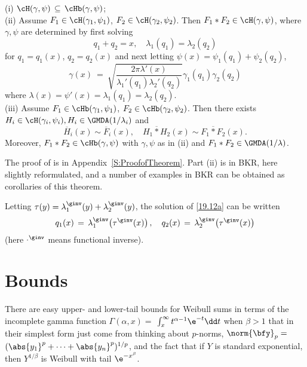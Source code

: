 \begin{theorem}\label{Th:19.12a}
{\rm (i)} $\cH(\gamma,\psi)\,\subseteq\,\cHb(\gamma,\psi)$;\\
 {\rm (ii)} Assume $F_1\in \cH(\gamma_1,\psi_1)$, $F_2\in \cH(\gamma_2,\psi_2)$. Then
 $F_1*F_2\in\cH(\gamma,\psi)$,
 where $\gamma,\psi$ are determined by first solving
 \begin{equation}\label{19.12a} q_1+q_2=x,\quad \lambda_1(q_1)=\lambda_2(q_2) \end{equation}
 for $q_1=q_1(x)$, $q_2=q_2(x)$ and next letting $\psi(x)=\psi_1(q_1)+\psi_2(q_2)$,
 \[\gamma(x)\ =\ \sqrt{ \frac{2\pi \lambda'(x)}{\lambda_1'(q_1) \lambda_2'(q_2)}}
\gamma_1(q_1)\gamma_2(q_2)
 \]
 where $\lambda(x)=\psi'(x)=\lambda_1(q_1)=\lambda_2(q_2)$.\\
  {\rm (iii)} Assume $F_1\in \cHb(\gamma_1,\psi_1)$, $F_2\in \cHb(\gamma_2,\psi_2)$. Then
	there exists $H_i \in  \cH(\gamma_i,\psi_i), H_i \in \GMDA(1/\lambda_i)$ and
	$$\overline H_i(x) \sim \overline F_i(x), \quad \overline{H_1*H_2}(x) \sim
	\overline{F_1*F_2}(x)  .$$
Moreover,   $F_1*F_2\in\cHb(\gamma,\psi)$ with $\gamma,\psi$ as in {\rm (ii)} and
$F_1*F_2\in \GMDA(1/\lambda)$.
\end{theorem}

The proof of  is in Appendix~\ref{S:ProofofTheorem}.
Part (ii) is in BKR, here slightly reformulated, and
a number of examples in BKR can be obtained as corollaries of this theorem.

\begin{remark}\label{Rem:19.12a}
Letting $\tau(y)=\lambda_1^{{\ginv}}(y)+\lambda_2^{{\ginv}}(y)$, the solution of \eqref{19.12a} can be written
\begin{equation}\label{19.12aa} q_1(x)\,=\,\lambda_1^{{\ginv}}\bigl(\tau^{{\ginv}}(x)\bigr) \,,\quad
q_2(x)\,=\,\lambda_2^{{\ginv}}\bigl(\tau^{{\ginv}}(x)\bigr)\end{equation}
(here $\cdot^{{\ginv}}$ means functional inverse).
\remQED\end{remark}

\section{Bounds}\label{S:Bounds}

There are easy upper- and lower-tail bounds for Weibull sums in terms of
the incomplete gamma function $\Gamma(\alpha,x)=$
$\int_x^\infty t^{\alpha-1} \e^{-t}\dd t$ when $\beta> 1$ that in their simplest form just come from thinking
about $p$-norms, $\norm{\bfy}_p= $ $( \abs{y_1}^p + \cdots + \abs{y_n}^p )^{1/p}$, and the fact that if $Y$ is standard exponential, then $Y^{1/\beta}$ is Weibull with tail $\e^{-x^\beta}$.


